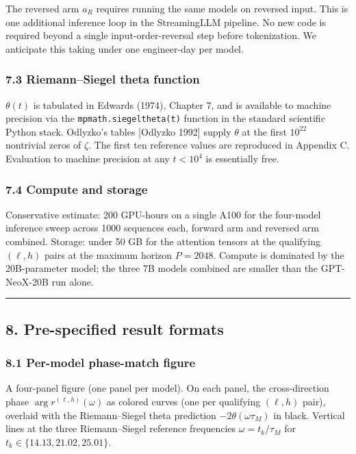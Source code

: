 \documentclass[
  letterpaper,
  11pt]{article}
\theoremstyle{plain}
\theoremstyle{definition}
\theoremstyle{remark}
\begin{document}
The reversed arm \(a_R\) requires running the same models on reversed input. This is one additional inference loop in the StreamingLLM pipeline. No new code is required beyond a single input-order-reversal step before tokenization. We anticipate this taking under one engineer-day per model.

\subsubsection{7.3 Riemann--Siegel theta function}\label{riemannsiegel-theta-function}

\(\theta(t)\) is tabulated in Edwards (1974), Chapter 7, and is available to machine precision via the \texttt{mpmath.siegeltheta(t)} function in the standard scientific Python stack. Odlyzko's tables {[}Odlyzko 1992{]} supply \(\theta\) at the first \(10^{22}\) nontrivial zeros of \(\zeta\). The first ten reference values are reproduced in Appendix C. Evaluation to machine precision at any \(t < 10^4\) is essentially free.

\subsubsection{7.4 Compute and storage}\label{compute-and-storage}

Conservative estimate: 200 GPU-hours on a single A100 for the four-model inference sweep across 1000 sequences each, forward arm and reversed arm combined. Storage: under 50 GB for the attention tensors at the qualifying \((\ell, h)\) pairs at the maximum horizon \(P = 2048\). Compute is dominated by the 20B-parameter model; the three 7B models combined are smaller than the GPT-NeoX-20B run alone.

\begin{center}\rule{0.5\linewidth}{0.5pt}\end{center}

\subsection{8. Pre-specified result formats}\label{pre-specified-result-formats}

\subsubsection{8.1 Per-model phase-match figure}\label{per-model-phase-match-figure}

A four-panel figure (one panel per model). On each panel, the cross-direction phase \(\arg r^{(\ell, h)}(\omega)\) as colored curves (one per qualifying \((\ell, h)\) pair), overlaid with the Riemann--Siegel theta prediction \(-2\theta(\omega \tau_M)\) in black. Vertical lines at the three Riemann--Siegel reference frequencies \(\omega = t_k/\tau_M\) for \(t_k \in \{14.13, 21.02, 25.01\}\).
\end{document}
